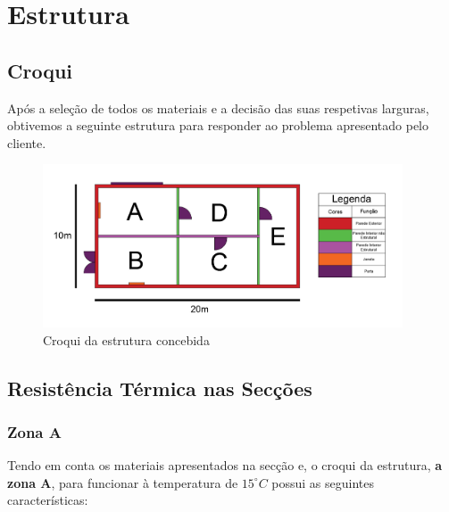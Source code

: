 \documentclass[12pt, a4paper]{article}
\begin{document}





\section{Estrutura}\label{sec:Estrutura}

\subsection{Croqui}\label{sub:croqui}

Ap\'os a sele\c{c}\~ao de todos os materiais e a decis\~ao das suas respetivas larguras,
obtivemos a seguinte estrutura para responder ao problema apresentado pelo cliente.

\begin{figure}[htpb]
    \begin{center}
        \includegraphics[width=0.95\textwidth]{img/sketch4.png}
    \end{center}
    \caption{Croqui da estrutura concebida}\label{fig:croqui}
\end{figure}



\subsection{Resist\^encia T\'ermica nas Sec\c{c}\~oes}\label{sub:Resistencia Termica nas Seccoes}

\subsubsection{Zona A}\label{ssub:zonaa}

Tendo em conta os materiais apresentados na secção e, o croqui da estrutura, \textbf{a zona A}, para funcionar
à temperatura de $ 15^\circ C $ possui as seguintes características:
\end{document}
